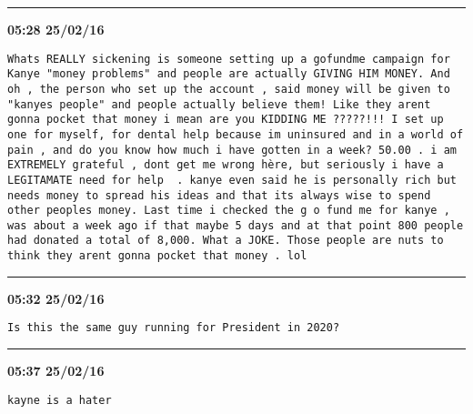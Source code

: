\hrule%

\begin{adjustwidth}{0cm}{0cm}
\footnotesize \textbf{05:28 25/02/16}

\begin{lstlisting}[breaklines, breakatwhitespace, basicstyle=\small, frame=leftline]
Whats REALLY sickening is someone setting up a gofundme campaign for Kanye "money problems" and people are actually GIVING HIM MONEY. And oh , the person who set up the account , said money will be given to "kanyes people" and people actually believe them! Like they arent gonna pocket that money i mean are you KIDDING ME ?????!!! I set up one for myself, for dental help because im uninsured and in a world of pain , and do you know how much i have gotten in a week? 50.00 . i am EXTREMELY grateful , dont get me wrong hère, but seriously i have a LEGITAMATE need for help  . kanye even said he is personally rich but needs money to spread his ideas and that its always wise to spend other peoples money. Last time i checked the g o fund me for kanye , was about a week ago if that maybe 5 days and at that point 800 people had donated a total of 8,000. What a JOKE. Those people are nuts to think they arent gonna pocket that money . lol
\end{lstlisting}
\end{adjustwidth}

\hrule%

\begin{adjustwidth}{0cm}{0cm}
\footnotesize \textbf{05:32 25/02/16}

\begin{lstlisting}[breaklines, breakatwhitespace, basicstyle=\small, frame=leftline]
Is this the same guy running for President in 2020?
\end{lstlisting}
\end{adjustwidth}

\hrule%

\begin{adjustwidth}{0cm}{0cm}
\footnotesize \textbf{05:37 25/02/16}

\begin{lstlisting}[breaklines, breakatwhitespace, basicstyle=\small, frame=leftline]
kayne is a hater
\end{lstlisting}
\end{adjustwidth}

